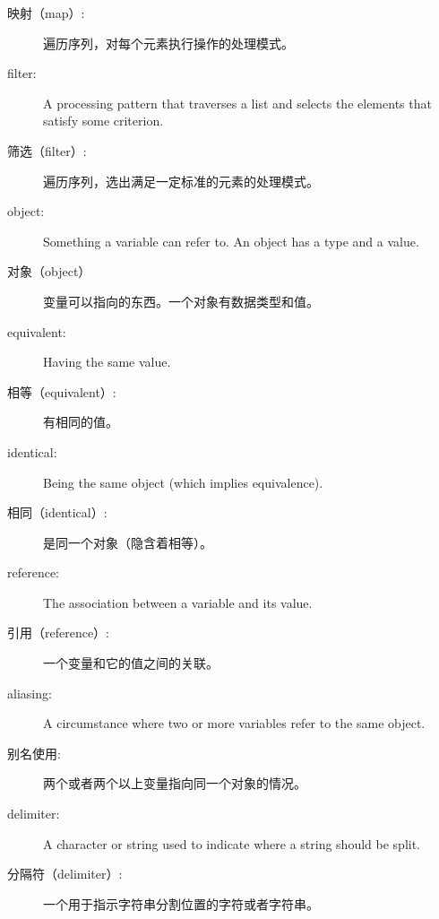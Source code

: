 \begin{description}
\item[映射（map）:] 遍历序列，对每个元素执行操作的处理模式。
  

\item[filter:] A processing pattern that traverses a list and
selects the elements that satisfy some criterion.
  

\item[筛选（filter）:] 遍历序列，选出满足一定标准的元素的处理模式。
  

\item[object:] Something a variable can refer to.  An object
has a type and a value.

\item[对象（object）] 变量可以指向的东西。一个对象有数据类型和值。

\item[equivalent:] Having the same value.

\item[相等（equivalent）:] 有相同的值。

\item[identical:] Being the same object (which implies equivalence).

\item[相同（identical）:] 是同一个对象（隐含着相等）。

\item[reference:] The association between a variable and its value.

\item[引用（reference）:] 一个变量和它的值之间的关联。

\item[aliasing:] A circumstance where two or more variables refer to the same
object.

\item[别名使用:] 两个或者两个以上变量指向同一个对象的情况。

\item[delimiter:] A character or string used to indicate where a
string should be split.

\item[分隔符（delimiter）:] 一个用于指示字符串分割位置的字符或者字符串。

\end{description}


